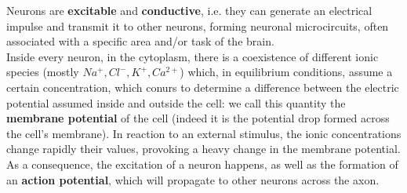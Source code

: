 \documentclass[a4paper]{article}
\begin{document}
		
	
	Neurons are \textbf{excitable} and \textbf{conductive}, i.e. they can generate an electrical impulse and transmit it to other neurons, forming neuronal microcircuits, often associated with a specific area and/or task of the brain. \\
	Inside every neuron, in the cytoplasm, there is a coexistence of different ionic species (mostly $Na^+, Cl^-, K^+, Ca^{2+}$) which, in equilibrium conditions, assume a certain concentration, which conurs to determine a difference between the electric potential assumed inside and outside the cell: we call this quantity the \textbf{membrane potential} of the cell (indeed it is the potential drop formed across the cell's membrane).  In reaction to an external stimulus, the ionic concentrations change rapidly their values, provoking a heavy change in the membrane potential. As a consequence, the excitation of a neuron happens, as well as the formation of an \textbf{action potential}, which will propagate to other neurons across the axon. 
\end{document}
